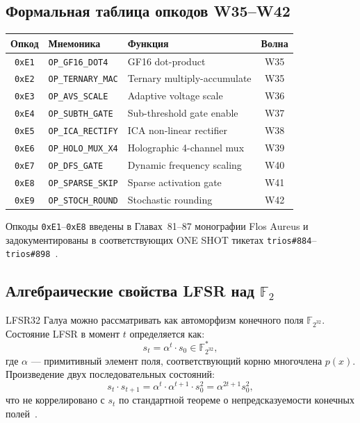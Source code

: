 \subsection{Формальная таблица опкодов W35--W42}
\label{ssec:glava88-opcode-table}

\begin{center}
\begin{tabular}{|c|l|l|c|}
\hline
Опкод & Мнемоника & Функция & Волна \\
\hline
\texttt{0xE1} & \texttt{OP\_GF16\_DOT4} & GF16 dot-product & W35 \\
\texttt{0xE2} & \texttt{OP\_TERNARY\_MAC} & Ternary multiply-accumulate & W35 \\
\texttt{0xE3} & \texttt{OP\_AVS\_SCALE} & Adaptive voltage scale & W36 \\
\texttt{0xE4} & \texttt{OP\_SUBTH\_GATE} & Sub-threshold gate enable & W37 \\
\texttt{0xE5} & \texttt{OP\_ICA\_RECTIFY} & ICA non-linear rectifier & W38 \\
\texttt{0xE6} & \texttt{OP\_HOLO\_MUX\_X4} & Holographic 4-channel mux & W39 \\
\texttt{0xE7} & \texttt{OP\_DFS\_GATE} & Dynamic frequency scaling & W40 \\
\texttt{0xE8} & \texttt{OP\_SPARSE\_SKIP} & Sparse activation gate & W41 \\
\texttt{0xE9} & \texttt{OP\_STOCH\_ROUND} & Stochastic rounding & W42 \\
\hline
\end{tabular}
\end{center}

Опкоды \texttt{0xE1}--\texttt{0xE8} введены в Главах~81--87
монографии Flos Aureus и задокументированы в соответствующих
ONE SHOT тикетах \texttt{trios\#884}--\texttt{trios\#898}~\cite{trios895,trios898}.

\subsection{Алгебраические свойства LFSR над $\mathbb{F}_2$}
\label{ssec:glava88-algebra}

LFSR32 Галуа можно рассматривать как автоморфизм
конечного поля $\mathbb{F}_{2^{32}}$.  Состояние LFSR
в момент $t$ определяется как:
\[
  s_t = \alpha^t \cdot s_0 \in \mathbb{F}_{2^{32}}^*,
\]
где $\alpha$ — примитивный элемент поля, соответствующий
корню многочлена $p(x)$.  Произведение двух последовательных
состояний:
\[
  s_t \cdot s_{t+1} = \alpha^t \cdot \alpha^{t+1} \cdot s_0^2 = \alpha^{2t+1} s_0^2,
\]
что не коррелировано с $s_t$ по стандартной теореме
о непредсказуемости конечных полей~\cite{gupta2015}.

